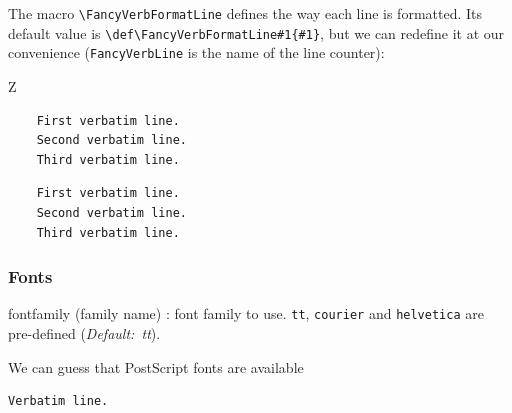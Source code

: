 \documentclass[twoside]{article}
\newcommand\cs[1]{\texttt{\textbackslash#1}}
\providecommand\optname[1]{\textsf{#1}}
\newenvironment{optlist}{\begin{description}%
  \renewcommand\makelabel[1]{%
    \descriptionlabel{\mdseries\optname{##1}}}%
  \itemsep0.25\itemsep}%
 {\end{description}}
\newif\ifPostScriptFonts \PostScriptFontstrue
\begin{document}
  The macro \cs{FancyVerbFormatLine} defines the way each line is formatted.
Its default value is \verb+\def\FancyVerbFormatLine#1{#1}+, but we can
redefine it at our convenience (\texttt{FancyVerbLine} is the name of the
line counter):

{
\begin{SideBySideExample}
  Z
  \renewcommand{\FancyVerbFormatLine}[1]{%
    \makebox[0cm][l]{$\Rightarrow$}#1}
  \begin{Verbatim}
    First verbatim line.
    Second verbatim line.
    Third verbatim line.
  \end{Verbatim}
\end{SideBySideExample}

\begin{SideBySideExample}
  \renewcommand{\FancyVerbFormatLine}[1]{%
    \ifodd\value{FancyVerbLine}%
      \MakeUppercase{#1}\else#1\fi}
  \begin{Verbatim}
    First verbatim line.
    Second verbatim line.
    Third verbatim line.
  \end{Verbatim}
\end{SideBySideExample}
}

\subsubsection{Fonts}

\begin{optlist}
  \item[fontfamily (family name)]: font family to use.
  \texttt{tt}, \texttt{courier} and \texttt{helvetica} are pre-defined
  (\emph{Default:~tt}).
\end{optlist}

\ifPostScriptFonts  We can guess that PostScript fonts are available

\begin{SideBySideExample}
  \begin{Verbatim}[fontfamily=helvetica]
    Verbatim line.
  \end{Verbatim}
\end{SideBySideExample}

\else
\begin{quote}
    \textbf{\large Warning!} PostScript fonts seems not available on your
  platform (we are looking for the file \texttt{times.sty}, so we will
  not show the examplaes using such PostScript fonts.
\end{quote}
\fi
\end{document}
